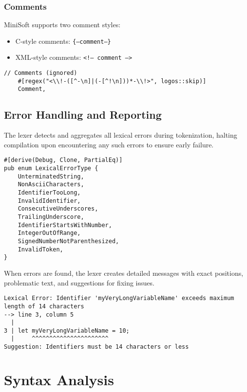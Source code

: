 \documentclass[12pt,a4paper]{article}
\begin{document}
\subsubsection{Comments}
MiniSoft supports two comment styles:
\begin{itemize}
	\item C-style comments: \texttt{\{--comment--\}}
	\item XML-style comments: \texttt{<!-- comment -->}
\end{itemize}

\begin{lstlisting}[caption={Comment Handling}]
    // Comments (ignored)
    #[regex("<\\!-([^-\n]|(-[^!\n]))*-\\!>", logos::skip)]
    Comment,
\end{lstlisting}

\subsection{Error Handling and Reporting}
The lexer detects and aggregates all lexical errors during tokenization, halting compilation upon encountering any such errors to ensure early failure.

\begin{lstlisting}[caption={Lexical Error Types}]
#[derive(Debug, Clone, PartialEq)]
pub enum LexicalErrorType {
    UnterminatedString,
    NonAsciiCharacters,
    IdentifierTooLong,
    InvalidIdentifier,
    ConsecutiveUnderscores,
    TrailingUnderscore,
    IdentifierStartsWithNumber,
    IntegerOutOfRange,
    SignedNumberNotParenthesized,
    InvalidToken,
}
\end{lstlisting}

When errors are found, the lexer creates detailed messages with exact positions, problematic text, and suggestions for fixing issues.

\begin{lstlisting}[caption={Sample Error Output}]
Lexical Error: Identifier 'myVeryLongVariableName' exceeds maximum length of 14 characters
--> line 3, column 5
  |
3 | let myVeryLongVariableName = 10;
  |     ^^^^^^^^^^^^^^^^^^^^^^ 
Suggestion: Identifiers must be 14 characters or less
\end{lstlisting}

\section{Syntax Analysis}
\end{document}
